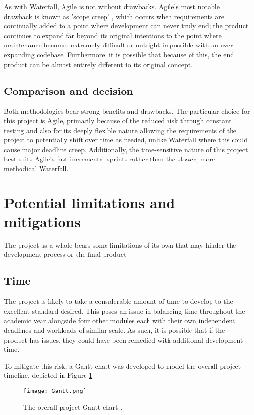 \para As with Waterfall, Agile is not without drawbacks. Agile's most notable drawback is known as 'scope creep' \autocite{malsamWhatScopeCreep2024},
which occurs when requirements are continually added to a point where development can never truly end; the product continues to expand 
far beyond its original intentions to the point where maintenance becomes extremely difficult or outright impossible with an 
ever-expanding codebase. Furthermore, it is possible that because of this, the end product can be almost entirely different to its original concept.

\subsection{Comparison and decision}

Both methodologies bear strong benefits and drawbacks. The particular choice for this project is Agile, primarily because of the reduced 
risk through constant testing and also for its deeply flexible nature allowing the requirements of the project to potentially shift 
over time as needed, unlike Waterfall where this could cause major deadline creep. Additionally, the time-sensitive nature of this project 
best suits Agile's fast incremental sprints rather than the slower, more methodical Waterfall.

\section{Potential limitations and mitigations}\label{sec:Limitations}
The project as a whole bears some limitations of its own that may hinder the development process or the final product.

\subsection{Time}
The project is likely to take a considerable amount of time to develop to the excellent standard desired. This poses an issue 
in balancing time throughout the academic year alongside four other modules each with their own independent deadlines and workloads
of similar scale. As such, it is possible that if the product has issues, they could have been remedied with additional development 
time.

\para To mitigate this risk, a Gantt chart was developed to model the overall project timeline, depicted in Figure \ref{fig:Gantt}

\begin{figure}[H]
    \centering
    \texttt{[image: Gantt.png]}
    \caption{The overall project Gantt chart \autocite{teamganttTeamGanttEasiestFREE}.\label{fig:Gantt}}
\end{figure}

